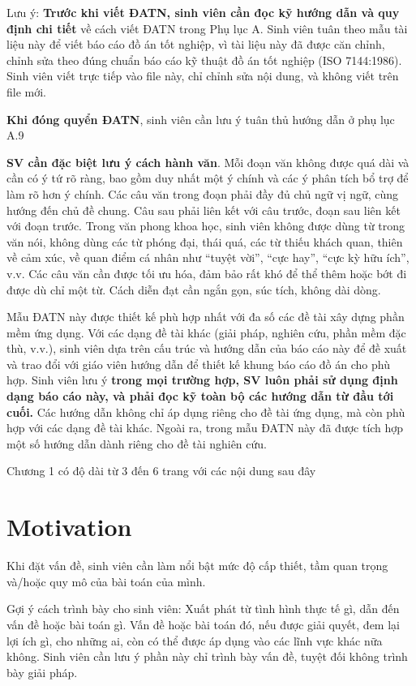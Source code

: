 \documentclass[../main.tex]{subfiles}
\begin{document}
Lưu ý: \textbf{Trước khi viết ĐATN, sinh viên cần đọc kỹ hướng dẫn và quy định chi tiết} về cách viết ĐATN trong Phụ lục A. Sinh viên tuân theo mẫu tài liệu này để viết báo cáo đồ án tốt nghiệp, vì tài liệu này đã được căn chỉnh, chỉnh sửa theo đúng chuẩn báo cáo kỹ thuật đồ án tốt nghiệp (ISO 7144:1986). Sinh viên viết trực tiếp vào file này, chỉ chỉnh sửa nội dung, và không viết trên file mới.

\textbf{Khi đóng quyển ĐATN}, sinh viên cần lưu ý tuân thủ hướng dẫn ở phụ lục A.9

\textbf{SV cần đặc biệt lưu ý cách hành văn}. Mỗi đoạn văn không được quá dài và cần có ý tứ rõ ràng, bao gồm duy nhất một ý chính và các ý phân tích bổ trợ để làm rõ hơn ý chính. Các câu văn trong đoạn phải đầy đủ chủ ngữ vị ngữ, cùng hướng đến chủ đề chung. Câu sau phải liên kết với câu trước, đoạn sau liên kết với đoạn trước. Trong văn phong khoa học, sinh viên không được dùng từ trong văn nói, không dùng các từ phóng đại, thái quá, các từ thiếu khách quan, thiên về cảm xúc, về quan điểm cá nhân như “tuyệt vời”, “cực hay”, “cực kỳ hữu ích”, v.v. Các câu văn cần được tối ưu hóa, đảm bảo rất khó để thể thêm hoặc bớt đi được dù chỉ một từ. Cách diễn đạt cần ngắn gọn, súc tích, không dài dòng.

Mẫu ĐATN này được thiết kế phù hợp nhất với đa số các đề tài xây dựng phần mềm ứng dụng. Với các dạng đề tài khác (giải pháp, nghiên cứu, phần mềm đặc thù, v.v.), sinh viên dựa trên cấu trúc và hướng dẫn của báo cáo này để đề xuất và trao đổi với giáo viên hướng dẫn để thiết kế khung báo cáo đồ án cho phù hợp. Sinh viên lưu ý \textbf{trong mọi trường hợp, SV luôn phải sử dụng định dạng báo cáo này, và phải đọc kỹ toàn bộ các hướng dẫn từ đầu tới cuối.} Các hướng dẫn không chỉ áp dụng riêng cho đề tài ứng dụng, mà còn phù hợp với các dạng đề tài khác. Ngoài ra, trong mẫu ĐATN này đã được tích hợp một số hướng dẫn dành riêng cho đề tài nghiên cứu.

Chương 1 có độ dài từ 3 đến 6 trang với các nội dung sau đây

\section{Motivation}
\label{section:1.1}
Khi đặt vấn đề, sinh viên cần làm nổi bật mức độ cấp thiết, tầm quan trọng và/hoặc quy mô của bài toán của mình.

Gợi ý cách trình bày cho sinh viên: Xuất phát từ tình hình thực tế gì, dẫn đến vấn đề hoặc bài toán gì. Vấn đề hoặc bài toán đó, nếu được giải quyết, đem lại lợi ích gì, cho những ai, còn có thể được áp dụng vào các lĩnh vực khác nữa không. Sinh viên cần lưu ý phần này chỉ trình bày vấn đề, tuyệt đối không trình bày giải pháp.
\end{document}
